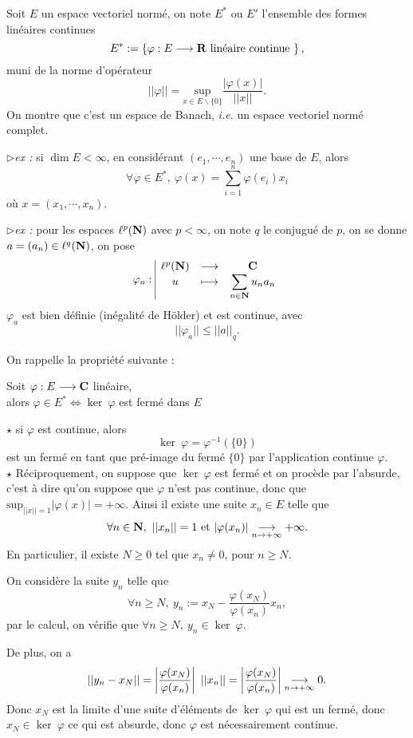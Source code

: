 \documentclass[a4paper,11pt, twoside]{article}
\begin{document}

Soit $E$ un espace vectoriel normé, on note $E^*$ ou $E'$ l'ensemble des formes linéaires continues
$$E^*:=\left\{\varphi:E\longrightarrow \mathbf R\text{ linéaire continue }\right\},$$ 
muni de la norme d'opérateur 
$$||\varphi||=\underset{x\in E\backslash\{0\}}{\mathrm{sup}}\frac{|\varphi(x)|}{||x||}.$$
On montre que c'est un espace de Banach, \emph{i.e.} un espace vectoriel normé complet.

$\triangleright$\emph{ex : }si $\dim E<\infty$, en considérant $(e_1,\cdots, e_n)$ une base de $E$, alors 
$$\forall \varphi\in E^*,\ \varphi(x)=\sum_{i=1}^n\varphi(e_i)x_i$$
où $x=(x_1,\cdots,x_n)$.

$\triangleright$\emph{ex : }pour les espaces $\ell^p(\mathbf N)$ avec $p<\infty$, on note $q$ le conjugué de $p$, on se donne $a=\left(a_n\right)\in\ell^q(\mathbf N)$, on pose 
$$\varphi_a:\begin{array}{|ccc}
  \ell^p(\mathbf N)&\longrightarrow&\mathbf C\\
  u&\longmapsto&\displaystyle\sum_{n\in\mathbf N}u_na_n 
\end{array}$$
$\varphi_a$ est bien définie (inégalité de Hölder) et est continue, avec 
$$||\varphi_a||\leqslant ||a||_q.$$

On rappelle la propriété suivante : 


\begin{prop}
  Soit $\varphi:E\longrightarrow \mathbf C$ linéaire,\\

  alors $\varphi\in E^*\Leftrightarrow\ker\ \varphi$ est fermé dans $E$
\end{prop}


\begin{Proof}
  $\star$ si $\varphi$ est continue, alors 
  $$\ker\ \varphi=\varphi^{-1}(\{0\})$$
  est un fermé en tant que pré-image du fermé $\{0\}$ par l'application continue $\varphi$.\\

  $\star$ Réciproquement, on suppose que $\ker\ \varphi$ est fermé et on procède par l'absurde, c'est à dire qu'on suppose que $\varphi$ n'est pas continue, donc que $\mathrm{sup}_{||x||=1}|\varphi(x)|=+\infty$. Ainsi il existe une  suite $x_n\in E$ telle que 
  $$\forall n\in \mathbf N,\ ||x_n||=1\text{ et }|\varphi(x_n)|\underset{n\to+\infty}{\longrightarrow} +\infty.$$
  En particulier, il existe $N\geqslant 0$ tel que $x_n\neq 0$, pour $n\geqslant N$.

  On considère la suite $y_n$ telle que 
  $$\forall n\geqslant N,\ y_n:=x_N-\frac{\varphi(x_N)}{\varphi(x_n)}x_n,$$
  par le calcul, on vérifie que $\forall n\geqslant N,\ y_n\in\ker\ \varphi$.

  De plus, on a 
  $$||y_n-x_N||=\left|\frac{\varphi(x_N)}{\varphi(x_n)}\right|\ ||x_n||=\left|\frac{\varphi(x_N)}{\varphi(x_n)}\right|\tend 0.$$
  Donc $x_N$ est la limite d'une suite d'éléments de $\ker\ \varphi$ qui est un fermé, donc $x_N\in\ker\ \varphi$ ce qui est absurde, donc $\varphi$ est nécessairement continue.
\end{Proof}
\end{document}
